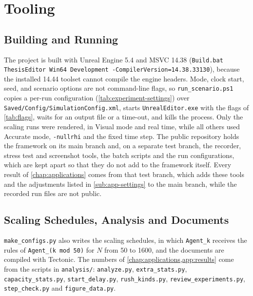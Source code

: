 \chapter{Tooling}\label{app:tooling}
\begingroup\raggedright

\section{Building and Running}\label{app:tooling-build}\label{app:tooling-runs}

The project is built with Unreal Engine 5.4 and MSVC 14.38 (\texttt{Build.bat ThesisEditor Win64 Development -CompilerVersion=14.38.33130}), because the installed 14.44 toolset cannot compile the engine headers. Mode, clock start, seed, and scenario options are not command-line flags, so \texttt{run\_scenario.ps1} copies a per-run configuration (\cref{tab:experiment-settings}) over \texttt{Saved/Config/SimulationConfig.xml}, starts \texttt{UnrealEditor.exe} with the flags of \cref{tab:flags}, waits for an output file or a time-out, and kills the process. Only the scaling runs were rendered, in Visual mode and real time, while all others used Accurate mode, \texttt{-nullrhi} and the fixed time step. The public repository \citep{armada2026repository} holds the framework on its main branch and, on a separate test branch, the recorder, stress test and screenshot tools, the batch scripts and the run configurations, which are kept apart so that they do not add to the framework itself. Every result of \cref{chap:applications} comes from that test branch, which adds these tools and the adjustments listed in \cref{sub:app-settings} to the main branch, while the recorded run files are not public.

\section{Scaling Schedules, Analysis and Documents}\label{app:tooling-scaling}\label{app:tooling-latex}

\texttt{make\_configs.py} also writes the scaling schedules, in which \texttt{Agent\_k} receives the rules of \texttt{Agent\_(k mod 50)} for $N$ from 50 to 1600, and the documents are compiled with Tectonic. The numbers of \cref{chap:applications,app:results} come from the scripts in \texttt{analysis/}: \texttt{analyze.py}, \texttt{extra\_stats.py}, \texttt{capacity\_stats.py}, \texttt{start\_delay.py}, \texttt{rush\_kinds.py}, \texttt{review\_experiments.py}, \texttt{step\_check.py} and \texttt{figure\_data.py}.

